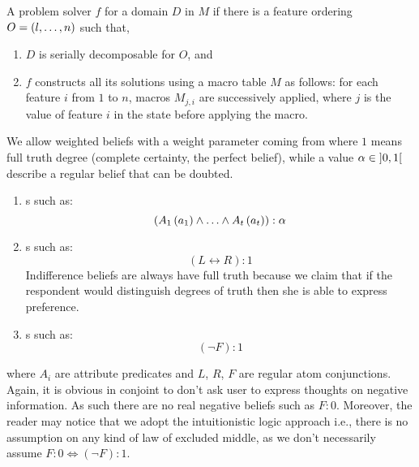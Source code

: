 \begin{defi}
A problem solver $f$  for a domain $D$ in $M$ if there is a feature ordering $O=\left( l,\ldots,n\right)$ such that,
\begin{enumerate}
 \item $D$ is serially decomposable for $O$, and
 \item $f$ constructs all its solutions using a macro table $M$ as follows: for each feature $i$ from $1$ to $n$, macros $M_{j,i}$ are successively applied, where $j$ is the value of feature $i$ in the state before applying the macro.
\end{enumerate}
\cite{conf/ijcai/Tadepalli91}
\end{defi}

\begin{defi}
We allow weighted beliefs with a weight parameter coming from  where $1$ means full truth degree (complete certainty, the perfect belief), while a value $\alpha\in\left]0,1\right[$ describe a regular belief that can be doubted.
\begin{enumerate}
 \item {}s such as:
 \begin{equation}
(A_1\left(a_1\right)\wedge\ldots\wedge A_t\left(a_t\right)):\alpha
 \end{equation}
 \item {}s such as:
 \begin{equation}
 \left(L\leftrightarrow R\right):1
 \end{equation}
 Indifference beliefs are always have full truth because we claim that if the respondent would distinguish degrees of truth then she is able to express preference.
 \item {}s such as:
 \begin{equation}
 \left(\neg F\right):1
 \end{equation}
\end{enumerate}
where $A_i$ are attribute predicates and $L$, $R$, $F$ are regular atom conjunctions. Again, it is obvious in conjoint to don't ask user to express thoughts on negative information. As such there are no real negative beliefs such as $F:0$. Moreover, the reader may notice that we adopt the intuitionistic logic approach i.e., there is no assumption on any kind of law of excluded middle, as we don't necessarily assume $F:0\Leftrightarrow\left(\neg F\right):1$.
\cite{conf/fedcsis/GiurcaSB12}
\end{defi}

